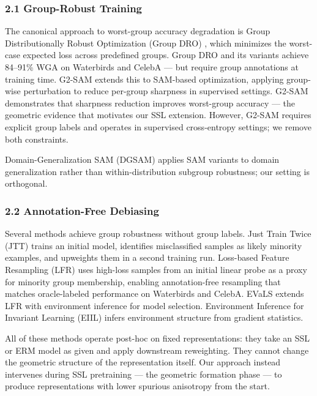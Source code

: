 
\subsubsection{2.1 Group-Robust Training}

The canonical approach to worst-group accuracy degradation is Group Distributionally Robust Optimization (Group DRO) \citep{Sagawa2019}, which minimizes the worst-case expected loss across predefined groups. Group DRO and its variants achieve 84--91\% WGA on Waterbirds and CelebA --- but require group annotations at training time. G2-SAM \citep{park2025g2sam} extends this to SAM-based optimization, applying group-wise perturbation to reduce per-group sharpness in supervised settings. G2-SAM demonstrates that sharpness reduction improves worst-group accuracy --- the geometric evidence that motivates our SSL extension. However, G2-SAM requires explicit group labels and operates in supervised cross-entropy settings; we remove both constraints.

Domain-Generalization SAM (DGSAM) \citep{Song2025} applies SAM variants to domain generalization rather than within-distribution subgroup robustness; our setting is orthogonal.

\subsubsection{2.2 Annotation-Free Debiasing}

Several methods achieve group robustness without group labels. Just Train Twice (JTT) \citep{liu2021just} trains an initial model, identifies misclassified samples as likely minority examples, and upweights them in a second training run. Loss-based Feature Resampling (LFR) \citep{ghaznavi2023lfr} uses high-loss samples from an initial linear probe as a proxy for minority group membership, enabling annotation-free resampling that matches oracle-labeled performance on Waterbirds and CelebA. EVaLS \citep{ghaznavi2024evals} extends LFR with environment inference for model selection. Environment Inference for Invariant Learning (EIIL) \citep{Creager2021} infers environment structure from gradient statistics.

All of these methods operate post-hoc on fixed representations: they take an SSL or ERM model as given and apply downstream reweighting. They cannot change the geometric structure of the representation itself. Our approach instead intervenes during SSL pretraining --- the geometric formation phase --- to produce representations with lower spurious anisotropy from the start.

